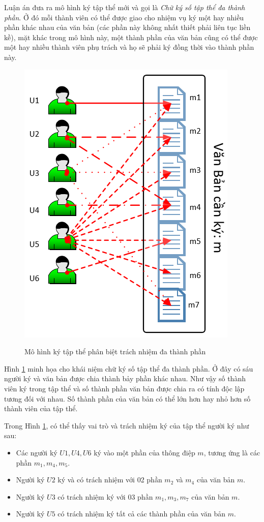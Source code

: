 Luận án đưa ra mô hình ký tập thể mới và gọi là \textit{Chữ ký số tập thể đa thành phần}. Ở đó mỗi thành viên có thể được giao cho nhiệm vụ ký một hay nhiều phần khác nhau của văn bản (các phần này không nhất thiết phải liên tục liền kề), mặt khác trong mô hình này, một thành phần của văn bản cũng có thể được một hay nhiều thành viên phụ trách và họ sẽ phải ký đồng thời vào thành phần này.


\begin{figure}[ht]	
	\begin{center}		
		\includegraphics[scale=0.5]{kytapthe3}
		\\		
	\end{center}	
	\caption{Mô hình ký tập thể phân biệt trách nhiệm đa thành phần}	
	\label{h.kytapthe3}
\end{figure}

Hình \ref{h.kytapthe3} minh họa cho khái niệm chữ ký số tập thể đa thành phần. Ở đây có sáu người ký và văn bản được chia thành bảy phần khác nhau. Như vậy số thành viên ký trong tập thể và số thành phần văn bản được chia ra có tính độc lập tương đối với nhau. Số thành phần của văn bản có thể lớn hơn hay nhỏ hơn số thành viên của tập thể. 

Trong Hình \ref{h.kytapthe3}, có thể thấy vai trò và trách nhiệm ký của tập thể người ký như sau:
\begin{itemize}
	\item Các người ký $U1, U4, U6$ ký vào một phần của thông điệp $m$, tương ứng là các phần $m_1, m_4, m_5$.
	\item Người ký $U2$ ký và có trách nhiệm với 02 phần $m_2$ và $m_4$ của văn bản $m$.
	\item Người ký $U3$ có trách nhiệm ký với 03 phần $m_1, m_3, m_7$ của văn bản $m$.
	\item Người ký $U5$ có trách nhiệm ký tất cả các thành phần của văn bản $m$.
\end{itemize}

